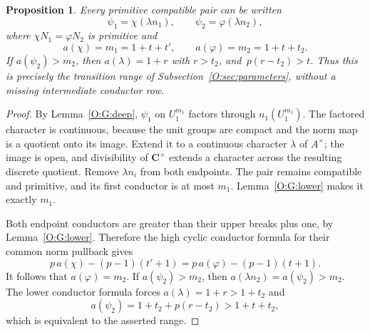 \documentclass[11pt]{amsart}
\newtheorem{proposition}[theorem]{Proposition}
\theoremstyle{definition}
\theoremstyle{remark}
\begin{document}
\begin{proposition}\label{O:G:reduce}
Every primitive compatible pair can be written
\[
 \psi_1=\chi(\lambda n_1),\qquad
 \psi_2=\varphi(\lambda n_2),
\]
where $\chi N_1=\varphi N_2$ is primitive and
\[
 a(\chi)=m_1=1+t+t',\qquad a(\varphi)=m_2=1+t+t_2.
\]
If $a(\psi_2)>m_2$, then $a(\lambda)=1+r$ with $r>t_2$, and
$\,p(r-t_2)>t$. Thus this is precisely the transition range of
Subsection~\ref{O:sec:parameters}, without a missing intermediate conductor row.
\end{proposition}
\begin{proof}
By Lemma~\ref{O:G:deep}, $\psi_1$ on $U_1^{m_1}$ factors through
$n_1(U_1^{m_1})$. The factored character is continuous, because the
unit groups are compact and the norm map is a quotient onto its
image. Extend it to a continuous character $\lambda$ of $A^\times$;
the image is open, and divisibility of $\mathbf C^\times$ extends a
character across the resulting discrete quotient.
Remove $\lambda n_i$ from both endpoints.
The pair remains compatible and primitive, and its first conductor is
at most $m_1$. Lemma~\ref{O:G:lower} makes it exactly $m_1$.

Both endpoint conductors are greater than their upper breaks plus
one, by Lemma~\ref{O:G:lower}. Therefore the high cyclic conductor formula
for their common norm pullback gives
\[
 p\,a(\chi)-(p-1)(t'+1)
 =p\,a(\varphi)-(p-1)(t+1).
\]
It follows that $a(\varphi)=m_2$.
If $a(\psi_2)>m_2$, then $a(\lambda n_2)=a(\psi_2)>m_2$.
The lower conductor formula forces $a(\lambda)=1+r>1+t_2$ and
\[
 a(\psi_2)=1+t_2+p(r-t_2)>1+t+t_2,
\]
which is equivalent to the asserted range.
\end{proof}
\end{document}
